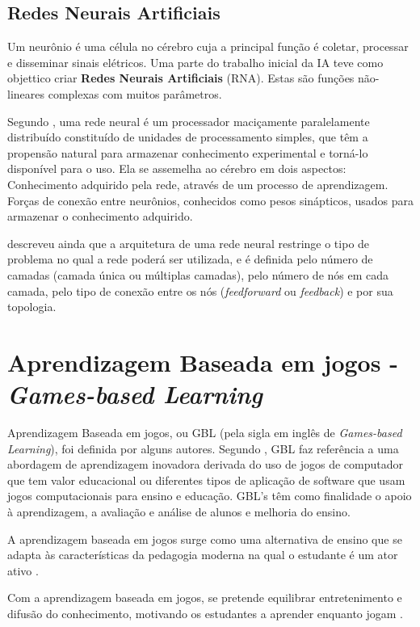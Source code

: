 \documentclass[
	12pt,				%
	openright,			%
	oneside,
	a4paper,			%
	english,			%
	french,				%
	spanish,			%
	brazil,				%
	]{abntex2}
\begin{document}
\subsection{Redes Neurais Artificiais}
\label{sec:RNA}
Um neurônio é uma célula no cérebro cuja a principal função é coletar, processar e disseminar sinais elétricos. Uma parte do trabalho inicial da IA teve como objettico criar \textbf{Redes Neurais Artificiais} (RNA). Estas são funções não-lineares complexas com muitos parâmetros. \cite{russell2004inteligencia}

Segundo , uma rede neural é um processador maciçamente paralelamente distribuído constituído de unidades de processamento simples, que têm a propensão natural para armazenar conhecimento experimental e torná-lo disponível para o uso. Ela se assemelha ao cérebro em dois aspectos: Conhecimento adquirido pela rede, através de um processo de aprendizagem. Forças de conexão entre neurônios, conhecidos como pesos sinápticos, usados para armazenar o conhecimento adquirido.

 descreveu ainda que a arquitetura de uma rede neural restringe o tipo de problema no qual a rede poderá ser utilizada, e é definida pelo número de camadas (camada única ou múltiplas camadas), pelo número de nós em cada camada, pelo tipo de conexão entre os nós (\textit{feedforward} ou \textit{feedback}) e por sua topologia.

\section{Aprendizagem Baseada em jogos - \textit{Games-based Learning}}
\label{sec:GBL}

Aprendizagem Baseada em jogos, ou GBL (pela sigla em inglês de \textit{Games-based Learning}), foi definida por alguns autores. Segundo , GBL faz referência a uma abordagem de aprendizagem inovadora derivada do uso de jogos de computador que tem valor educacional ou diferentes tipos de aplicação de software que usam jogos computacionais para ensino e educação. GBL's têm como finalidade o apoio à aprendizagem, a avaliação e análise de alunos e melhoria do ensino.

A aprendizagem baseada em jogos surge como uma alternativa de ensino que se adapta às características da pedagogia moderna na qual o estudante é um ator ativo \cite{monsalve2014aprendizagem}.

Com a aprendizagem baseada em jogos, se pretende equilibrar entretenimento e difusão do conhecimento, motivando os estudantes a aprender enquanto jogam \cite{monsalve2011teaching}.
\end{document}
